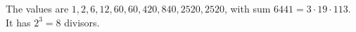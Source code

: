 The values are $1,2,6,12,60,60,420,840,2520,2520$, with sum $6441=3\cdot19\cdot113$. It has $2^3=\boxed{8}$ divisors.
